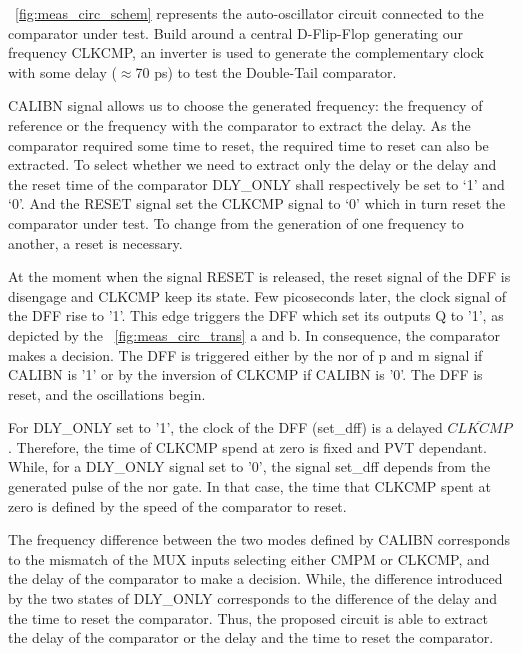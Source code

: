 \figurename~\ref{fig:meas_circ_schem} represents the auto-oscillator circuit connected to the comparator under test. Build around a central D-Flip-Flop generating our frequency CLKCMP, an inverter is used to generate the complementary clock with some delay (\(\approx\)70 ps) to test the Double-Tail comparator.

CALIBN signal allows us to choose the generated frequency: the frequency of reference or the frequency with the comparator to extract the delay. As the comparator required some time to reset, the required time to reset can also be extracted. To select whether we need to extract only the delay or the delay and the reset time of the comparator DLY\_ONLY shall respectively be set to `1' and `0'. And the RESET signal set the CLKCMP signal to `0' which in turn reset the comparator under test. To change from the generation of one frequency to another, a reset is necessary.

At the moment when the signal RESET is released, the reset signal of the DFF is disengage and CLKCMP keep its state. Few picoseconds later, the clock signal of the DFF rise to '1'. This edge triggers the DFF which set its outputs Q to '1', as depicted by the \figurename~\ref{fig:meas_circ_trans} a and b. In consequence, the comparator makes a decision. The DFF is triggered either by the nor of p and m signal if CALIBN is '1' or by the inversion of CLKCMP if CALIBN is '0'. The DFF is reset, and the oscillations begin.

For DLY\_ONLY set to '1', the clock of the DFF (set\_dff) is a delayed \(\overline{CLKCMP}\). Therefore, the time of CLKCMP spend at zero is fixed and PVT dependant. While, for a DLY\_ONLY signal set to '0', the signal set\_dff depends from the generated pulse of the nor gate. In that case, the time that CLKCMP spent at zero is defined by the speed of the comparator to reset.

The frequency difference between the two modes defined by CALIBN corresponds to the mismatch of the MUX inputs selecting either CMPM or CLKCMP, and the delay of the comparator to make a decision. While, the difference introduced by the two states of DLY\_ONLY corresponds to the difference of the delay and the time to reset the comparator. Thus, the proposed circuit is able to extract the delay of the comparator or the delay and the time to reset the comparator.

